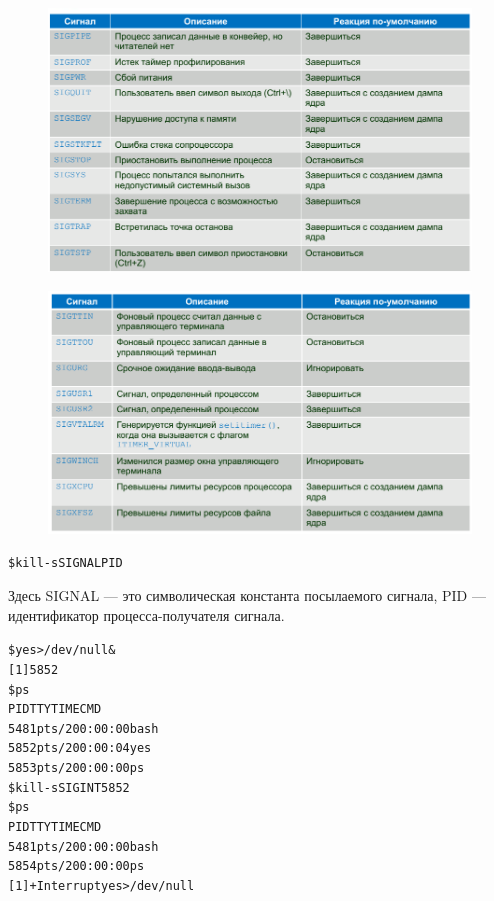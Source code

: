 \documentclass[xcolor=table]{beamer}
\begin{document}
\begin{frame}[fragile]
	\begin{figure}[h]
		\centering
		\includegraphics[scale=0.5]{images/signals-2.png}
	\end{figure}
\end{frame}

\begin{frame}[fragile]
	\begin{figure}[h]
		\centering
		\includegraphics[scale=0.5]{images/signals-3.png}
	\end{figure}
\end{frame}

\begin{frame}[fragile]
\begin{alltt}
\$ kill -s SIGNAL PID
\end{alltt}
Здесь SIGNAL — это символическая константа посылаемого сигнала, PID — идентификатор процесса-получателя сигнала. 
\begin{alltt}
\$ yes > /dev/null &
[1] 5852
\$ ps
PID TTY TIME CMD
5481 pts/2 00:00:00 bash
5852 pts/2 00:00:04 yes
5853 pts/2 00:00:00 ps
\$ kill -s SIGINT 5852
\$ ps
PID TTY TIME CMD
5481 pts/2 00:00:00 bash
5854 pts/2 00:00:00 ps
[1]+ Interrupt yes >/dev/null
\end{alltt}
\end{frame}
\end{document}
